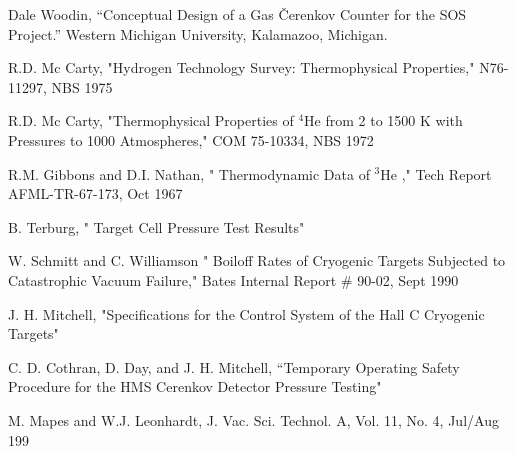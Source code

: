 Dale Woodin, ``Conceptual Design of a Gas
\v{C}erenkov Counter for the SOS Project.''  Western Michigan
University, Kalamazoo, Michigan.


 R.D. Mc Carty, "Hydrogen Technology Survey: Thermophysical
Properties," N76-11297, NBS 1975


 R.D. Mc Carty, "Thermophysical Properties of $^4$He from
2 to 1500 K with Pressures to 1000 Atmospheres," COM 75-10334, NBS 1972

 R.M. Gibbons and D.I. Nathan, " Thermodynamic Data
of $^3$He ," Tech Report AFML-TR-67-173, Oct 1967

 B. Terburg, " Target Cell Pressure Test Results"

 W. Schmitt and C. Williamson " Boiloff Rates of
Cryogenic Targets Subjected to Catastrophic Vacuum Failure,"
Bates Internal Report \# 90-02, Sept 1990

 J. H. Mitchell, "Specifications for the Control System of
the Hall C Cryogenic Targets"


 C. D. Cothran, D. Day, and J. H. Mitchell,
``Temporary Operating Safety
Procedure for the HMS Cerenkov Detector Pressure Testing"

M. Mapes and W.J. Leonhardt, J. Vac. Sci. Technol. A, Vol.
11, No. 4, Jul/Aug 199



